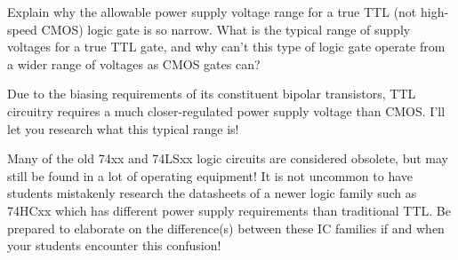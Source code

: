 

Explain why the allowable power supply voltage range for a true TTL (not high-speed CMOS) logic gate is so narrow.  What is the typical range of supply voltages for a true TTL gate, and why can't this type of logic gate operate from a wider range of voltages as CMOS gates can?







Due to the biasing requirements of its constituent bipolar transistors, TTL circuitry requires a much closer-regulated power supply voltage than CMOS.  I'll let you research what this typical range is!







Many of the old 74xx and 74LSxx logic circuits are considered obsolete, but may still be found in a lot of operating equipment!  It is not uncommon to have students mistakenly research the datasheets of a newer logic family such as 74HCxx which has different power supply requirements than traditional TTL.  Be prepared to elaborate on the difference(s) between these IC families if and when your students encounter this confusion!




